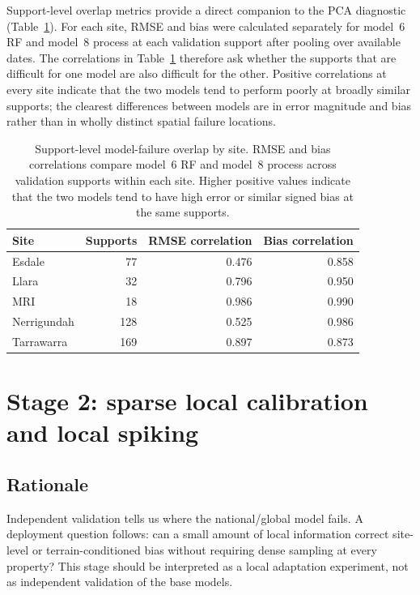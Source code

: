 \documentclass[11pt,a4paper]{article}
\newcommand{\modelSix}{model~6 RF}
\newcommand{\modelEight}{model~8 process}
\begin{document}
Support-level overlap metrics provide a direct companion to the PCA diagnostic
(Table~\ref{tab:model-failure-overlap}).  For each site, RMSE and bias were
calculated separately for \modelSix{} and \modelEight{} at each validation
support after pooling over available dates.  The correlations in
Table~\ref{tab:model-failure-overlap} therefore ask whether the supports that
are difficult for one model are also difficult for the other.  Positive
correlations at every site indicate that the two models tend to perform poorly
at broadly similar supports; the clearest differences between models are in
error magnitude and bias rather than in wholly distinct spatial failure
locations.

\begin{table}[htbp]
\centering
\small
\caption{Support-level model-failure overlap by site.  RMSE and bias
correlations compare \modelSix{} and \modelEight{} across validation supports
within each site.  Higher positive values indicate that the two models tend to
have high error or similar signed bias at the same supports.}
\label{tab:model-failure-overlap}
\begin{tabular}{lrrr}
\toprule
Site & Supports & RMSE correlation & Bias correlation \\
\midrule
Esdale & 77 & 0.476 & 0.858 \\
Llara & 32 & 0.796 & 0.950 \\
MRI & 18 & 0.986 & 0.990 \\
Nerrigundah & 128 & 0.525 & 0.986 \\
Tarrawarra & 169 & 0.897 & 0.873 \\
\bottomrule
\end{tabular}
\end{table}


\FloatBarrier

\section{Stage 2: sparse local calibration and local spiking}
\label{sec:stage2}

\subsection{Rationale}\label{sec:stage2-rationale}

Independent validation tells us where the national/global model fails.  A
deployment question follows: can a small amount of local information correct
site-level or terrain-conditioned bias without requiring dense sampling at
every property?  This stage should be interpreted as a local adaptation
experiment, not as independent validation of the base models.
\end{document}
